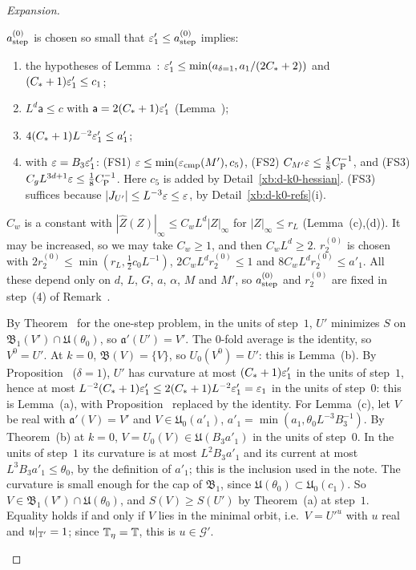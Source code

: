\begin{proof}[Expansion]
\begin{step}\label{xb:d-k0-constants}
$a^{(0)}_{\rm step}$ is chosen so small that $\varepsilon'_1\le a^{(0)}_{\rm step}$ implies:
\begin{enumerate}[label=(c\arabic*)]
\item the hypotheses of Lemma~: $\varepsilon'_1\le\min(a_{\delta=1},a_1/(2C_*+2))$ and $(C_*+1)\varepsilon'_1\le c_1$;
\item $L^d\mathsf a\le c$ with $\mathsf a=2(C_*+1)\varepsilon'_1$ (Lemma~);
\item $4(C_*+1)L^{-2}\varepsilon'_1\le a'_1$;
\item with $\varepsilon=B_3\varepsilon'_1$: (FS1) $\varepsilon\le\min(\varepsilon_{\rm cmp}(M'),c_5)$, (FS2) $C_{M'}\varepsilon\le\frac18C_{\rm P}^{-1}$, and (FS3) $C_gL^{3d+1}\varepsilon\le\frac18C_{\rm P}^{-1}$. Here $c_5$ is added by Detail~\ref{xb:d-k0-hessian}. (FS3) suffices because $|J_{U'}|\le L^{-3}\varepsilon\le\varepsilon$, by Detail~\ref{xb:d-k0-refs}(i).
\end{enumerate}
$C_w$ is a constant with $|\hat Z(Z)|_\infty\le C_wL^d|Z|_\infty$ for $|Z|_\infty\le r_L$ (Lemma~(c),(d)). It may be increased, so we may take $C_w\ge1$, and then $C_wL^d\ge2$. $r^{(0)}_2$ is chosen with $2r^{(0)}_2\le\min(r_L,\frac12c_0L^{-1})$, $2C_wL^dr^{(0)}_2\le1$ and $8C_wL^dr^{(0)}_2\le a'_1$. All these depend only on $d$, $L$, $G$, $a$, $\alpha$, $M$ and $M'$, so $a^{(0)}_{\rm step}$ and $r^{(0)}_2$ are fixed in step~(4) of Remark~.
\end{step}

\begin{step}[(a), composition at $k=0$]
By Theorem~ for the one-step problem, in the units of step~$1$, $U'$ minimizes $S$ on $\mathfrak B_1(V')\cap\mathfrak U(\theta_0)$, so $\mathfrak a'(U')=V'$. The $0$-fold average is the identity, so $V^0=U'$. At $k=0$, $\mathfrak B(V)=\{V\}$, so $U_0(V^0)=U'$: this is Lemma~(b). By Proposition~ ($\delta=1$), $U'$ has curvature at most $(C_*+1)\varepsilon'_1$ in the units of step~$1$, hence at most $L^{-2}(C_*+1)\varepsilon'_1\le2(C_*+1)L^{-2}\varepsilon'_1=\varepsilon_1$ in the units of step~$0$: this is Lemma~(a), with Proposition~ replaced by the identity. For Lemma~(c), let $V$ be real with $\mathfrak a'(V)=V'$ and $V\in\mathfrak U_0(a'_1)$, $a'_1=\min(a_1,\theta_0L^{-3}B_3^{-1})$. By Theorem~(b) at $k=0$, $V=U_0(V)\in\mathfrak U(B_3a'_1)$ in the units of step~$0$. In the units of step~$1$ its curvature is at most $L^2B_3a'_1$ and its current at most $L^3B_3a'_1\le\theta_0$, by the definition of $a'_1$; this is the inclusion used in the note. The curvature is small enough for the cap of $\mathfrak B_1$, since $\mathfrak U(\theta_0)\subset\mathfrak U_0(c_1)$. So $V\in\mathfrak B_1(V')\cap\mathfrak U(\theta_0)$, and $S(V)\ge S(U')$ by Theorem~(a) at step~$1$. Equality holds if and only if $V$ lies in the minimal orbit, i.e.\ $V=U'^u$ with $u$ real and $u|_{\mathbb T'}=1$; since $\mathbb T_\eta=\mathbb T$, this is $u\in\mathcal G'$.
\end{step}


\end{proof}
